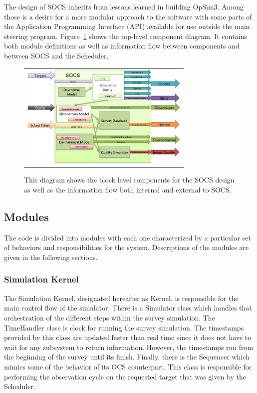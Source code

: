 \documentclass[]{spie}  %
\begin{document}
The design of SOCS inherits from lessons learned in building OpSim3. Among those is a desire for a more modular approach to the software with some parts of the Application Programming Interface (API) available for use outside the main steering program. Figure~\ref{fig:comparch} shows the top-level component diagram. It contains both module definitions as well as information flow between components and between SOCS and the Scheduler.

\begin{figure} [ht]
\begin{center}
\begin{tabular}{c}
\includegraphics[height=5cm]{CompArch.png}
\end{tabular}
\end{center}
\caption[example]
{ \label{fig:comparch} 
This diagram shows the block level components for the SOCS design as well as the information flow both internal and external to SOCS.}
\end{figure}

\subsection{Modules}

The code is divided into modules with each one characterized by a particular set of behaviors and responsibilities for the system. Descriptions of the modules are given in the following sections.

\subsubsection{Simulation Kernel}

The Simulation Kernel, designated hereafter as Kernel, is responsible for the main control flow of the simulator. There is a Simulator class which handles that orchestration of the different steps within the survey simulation. The TimeHandler class is clock for running the survey simulation. The timestamps provided by this class are updated faster than real time since it does not have to wait for any subsystem to return information. However, the timestamps run from the beginning of the survey until its finish. Finally, there is the Sequencer which mimics some of the behavior of its OCS counterpart. This class is responsible for performing the observation cycle on the requested target that was given by the Scheduler. 
\end{document}
